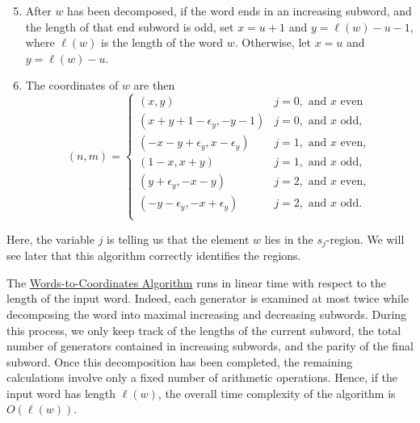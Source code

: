 \documentclass[11pt]{article}
\begin{document}
\begin{algorithm}
\begin{enumerate}
\setcounter{enumi}{4}
    \item After $w$ has been decomposed, if the word ends in an increasing subword, and the length of that end subword is odd, set $x=u+1$ and $y=\ell(w)-u-1$, where $\ell(w)$ is the length of the word $w$. Otherwise, let $x=u$ and $y=\ell(w)-u$.
\item The coordinates of $w$ are then
\[(n,m)=\begin{cases}
    (x,y)& j=0,\text{ and }x \text{ even}\\
    (x+y+1-\epsilon_y,-y-1)& j=0, \text{ and }x \text{ odd},\\
    (-x-y+\epsilon_y,x-\epsilon_y)& j=1, \text{ and }x \text{ even},\\
    (1-x,x+y)& j=1, \text{ and }x\text{ odd},\\
    (y+\epsilon_{y},-x-y)& j=2, \text{ and } x \text{ even},\\
    (-y-\epsilon_y,-x+\epsilon_y)& j=2, \text{ and } x \text{ odd}.\\
\end{cases}\]
\end{enumerate}

\end{algorithm}


\begin{remark}
    Here, the variable $j$ is telling us that the element $w$ lies in the $s_j$-region. We will see later that this algorithm correctly identifies the regions. 
\end{remark}

\begin{remark}\label{timecomplexity}
The \hyperref[algorithm]{Words-to-Coordinates Algorithm} runs in linear time with respect to the length of the input word. Indeed, each generator is examined at most twice while decomposing the word into maximal increasing and decreasing subwords. During this process, we only keep track of the lengths of the current subword, the total number of generators contained in increasing subwords, and the parity of the final subword. Once this decomposition has been completed, the remaining calculations involve only a fixed number of arithmetic operations. Hence, if the input word has length $\ell(w)$, the overall time complexity of the algorithm is $O(\ell(w))$.
\end{remark}
\end{document}

